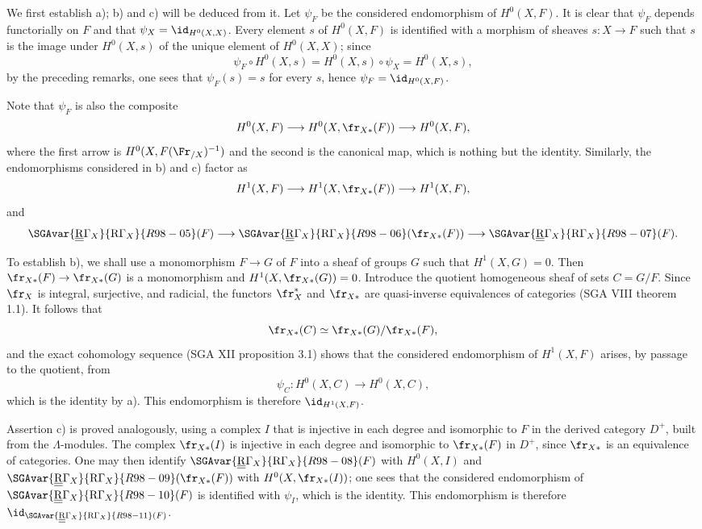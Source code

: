 We first establish a); b) and c) will be deduced from it. Let $\psi_F$ be the considered endomorphism of $H^0(X,F)$. It is clear that $\psi_F$ depends functorially on $F$ and that $\psi_X=\id_{H^0(X,X)}$. Every element $s$ of $H^0(X,F)$ is identified with a morphism of sheaves $s:X\to F$ such that $s$ is the image under $H^0(X,s)$ of the unique element of $H^0(X,X)$; since
\[
\psi_F\circ H^0(X,s)=H^0(X,s)\circ\psi_X=H^0(X,s),
\]
by the preceding remarks, one sees that $\psi_F(s)=s$ for every $s$, hence $\psi_F=\id_{H^0(X,F)}$.

Note that $\psi_F$ is also the composite
\[
H^0(X,F)\longrightarrow H^0(X,\fr_{X*}(F))
\longrightarrow H^0(X,F),
\]
where the first arrow is $H^0(X,F(\Fr_{/X})^{-1})$ and the second is the canonical map, which is nothing but the identity. Similarly, the endomorphisms considered in b) and c) factor as
\[
H^1(X,F)\longrightarrow H^1(X,\fr_{X*}(F))
\longrightarrow H^1(X,F),
\]
and
\[
\SGAvar{\underline{\underline{\mathrm{R}}}\Gamma_X}{\mathrm{R}\Gamma_X}{R98-05}(F)\longrightarrow \SGAvar{\underline{\underline{\mathrm{R}}}\Gamma_X}{\mathrm{R}\Gamma_X}{R98-06}(\fr_{X*}(F))
\longrightarrow \SGAvar{\underline{\underline{\mathrm{R}}}\Gamma_X}{\mathrm{R}\Gamma_X}{R98-07}(F).
\]

To establish b), we shall use a monomorphism $F\to G$ of $F$ into a sheaf of groups $G$ such that $H^1(X,G)=0$. Then $\fr_{X*}(F)\to\fr_{X*}(G)$ is a monomorphism and $H^1(X,\fr_{X*}(G))=0$. Introduce the quotient homogeneous sheaf of sets $C=G/F$. Since $\fr_X$ is integral, surjective, and radicial, the functors $\fr_X^*$ and $\fr_{X*}$ are quasi-inverse equivalences of categories (SGA VIII theorem 1.1). It follows that
\[
\fr_{X*}(C)\simeq\fr_{X*}(G)/\fr_{X*}(F),
\]
and the exact cohomology sequence (SGA XII proposition 3.1) shows that the considered endomorphism of $H^1(X,F)$ arises, by passage to the quotient, from
\[
\psi_C:H^0(X,C)\longrightarrow H^0(X,C),
\]
which is the identity by a). This endomorphism is therefore $\id_{H^1(X,F)}$.

Assertion c) is proved analogously, using a complex $I$ that is injective in each degree and isomorphic to $F$ in the derived category $D^+$, built from the $\Lambda$-modules. The complex $\fr_{X*}(I)$ is injective in each degree and isomorphic to $\fr_{X*}(F)$ in $D^+$, since $\fr_{X*}$ is an equivalence of categories. One may then identify $\SGAvar{\underline{\underline{\mathrm{R}}}\Gamma_X}{\mathrm{R}\Gamma_X}{R98-08}(F)$ with $H^0(X,I)$ and $\SGAvar{\underline{\underline{\mathrm{R}}}\Gamma_X}{\mathrm{R}\Gamma_X}{R98-09}(\fr_{X*}(F))$ with $H^0(X,\fr_{X*}(I))$; one sees that the considered endomorphism of $\SGAvar{\underline{\underline{\mathrm{R}}}\Gamma_X}{\mathrm{R}\Gamma_X}{R98-10}(F)$ is identified with $\psi_I$, which is the identity. This endomorphism is therefore $\id_{\SGAvar{\underline{\underline{\mathrm{R}}}\Gamma_X}{\mathrm{R}\Gamma_X}{R98-11}(F)}$.


